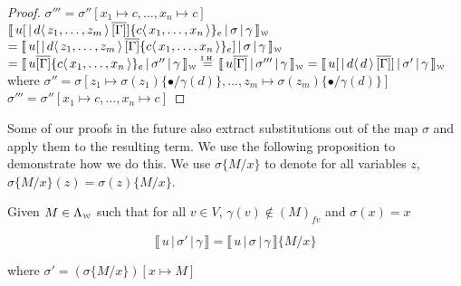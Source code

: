 \documentclass[a4paper,UKenglish,cleveref, autoref]{lipics-v2019}
\newcommand{\WEAK}{\Lambda_{\weaksymbol}}
\newcommand{\fv}[1]{(#1)_{fv}}
\newcommand{\dist}[5]{#1 [ #2 \, \vert \, \fakedist{#4}{#5} \, #3 ]}
\newcommand{\fakedist}[2]{#1 \langle \, #2 \, \rangle}
\newcommand{\sub}[3]{#1 \{ #2 / #3 \}}
\newcommand{\exor}[3]{#1 \{ \fakedist{#2}{#3} \}_{e}}
\newcommand{\weaksymbol}{\mbox{\tiny $\mathcal{W}$}}
\newcommand{\readbackwmap}[3]{\llbracket \, #1 \, \vert \, #2 \, \vert \, #3  \, \rrbracket }
\newcommand{\readweakwmap}[3]{\llbracket \, #1 \, \vert \, #2 \, \vert \, #3  \, \rrbracket_{\weaksymbol} }
\newcommand{\IH}{\stackrel{\hbox{\tiny I.H.}}{\hbox{=}}}
\begin{document}
\begin{proof}
\newline
$\sigma''' = \sigma'' [x_{1} \mapsto c, \dots , x_{n} \mapsto c]$
\newline
\newline
$\readweakwmap{\dist{u}{}{\overline{[\Gamma]}}{d}{z_{1}, \dots, z_{m}} \exor{}{c}{x_{1}, \dots, x_{n}} }{\sigma}{\gamma}$
\newline
$ = \readweakwmap{\dist{u}{}{\overline{[\Gamma]}  \exor{}{c}{x_{1}, \dots, x_{n}} }{d}{z_{1}, \dots, z_{m}} }{\sigma}{\gamma}$
\newline
$= \readweakwmap{u \overline{[\Gamma]}  \exor{}{c}{x_{1}, \dots, x_{n}} }{\sigma''}{\gamma} \IH \readweakwmap{u \overline{[\Gamma]} }{\sigma'''}{\gamma} = \readweakwmap{\dist{u}{}{\overline{[\Gamma]}}{d}{d} }{\sigma'}{\gamma} $
\newline
where
\newline
$\sigma'' = \sigma[z_{1} \mapsto  \sigma(z_{1})  \sub{}{\bullet}{\gamma(d)}, \dots, z_{m} \mapsto \sigma(z_{m}) \sub{}{\bullet}{\gamma(d)}]$
\newline
$\sigma''' = \sigma'' [x_{1} \mapsto c, \dots , x_{n} \mapsto c]$
\end{proof}

Some of our proofs in the future also extract substitutions out of the map $\sigma$ and apply them to the resulting term. We use the following proposition to demonstrate how we do this. We use $\sigma \sub{}{M}{x}$ to denote for all variables $z$, $\sigma \sub{}{M}{x} (z) = \sigma(z) \sub{}{M}{x}$.

\begin{proposition}
\label{prop:suboutcommweak}
Given $M \in \WEAK$ such that for all $v \in V$, $\gamma(v) \not\in \fv{M}$  and $\sigma(x) = x$

$$\readbackwmap{u}{\sigma'}{\gamma} = \readbackwmap{u}{\sigma}{\gamma} \sub{}{M}{x}$$

where  $\sigma' = (\sigma \sub{}{M}{x}) [x \mapsto M]$
\end{proposition}
\end{document}
